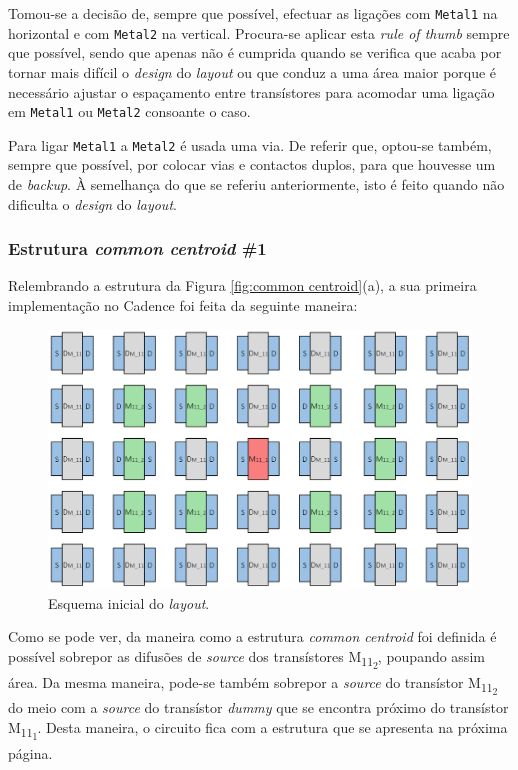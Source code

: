 \documentclass[11pt]{article}
\numberwithin{equation}{section}
\begin{document}
Tomou-se a decisão de, sempre que possível, efectuar as ligações com \texttt{Metal1} na horizontal e com \texttt{Metal2} na vertical. Procura-se aplicar esta \textit{rule of thumb} sempre que possível, sendo que apenas não é cumprida quando se verifica que acaba por tornar mais difícil o \textit{design} do \textit{layout} ou que conduz a uma área maior porque é necessário ajustar o espaçamento entre transístores para acomodar uma ligação em \texttt{Metal1} ou \texttt{Metal2} consoante o caso.

Para ligar \texttt{Metal1} a \texttt{Metal2} é usada uma via. De referir que, optou-se também, sempre que possível, por colocar vias e contactos duplos, para que houvesse um de \textit{backup}. À semelhança do que se referiu anteriormente, isto é feito quando não dificulta o \textit{design} do \textit{layout}.

\subsubsection{Estrutura \textit{common centroid} \#1}

Relembrando a estrutura da Figura \ref{fig:common centroid}(a), a sua primeira implementação no Cadence foi feita da seguinte maneira:

\begin{figure}[H]
	\centering
	\includegraphics[keepaspectratio=true, scale=0.30]{teoricas/layout/cc1_1}
	\vspace{-0.5em}
	\caption{Esquema inicial do \textit{layout}.}
	\vspace{-0.8em} 
\end{figure}

Como se pode ver, da maneira como a estrutura \textit{common centroid} foi definida é possível sobrepor as difusões de \textit{source} dos transístores M\textsubscript{11\textsubscript{2}}, poupando assim área. Da mesma maneira, pode-se também sobrepor a \textit{source} do transístor M\textsubscript{11\textsubscript{2}} do meio com a \textit{source} do transístor \textit{dummy} que se encontra próximo do transístor M\textsubscript{11\textsubscript{1}}. Desta maneira, o circuito fica com a estrutura que se apresenta na próxima página.
\end{document}
